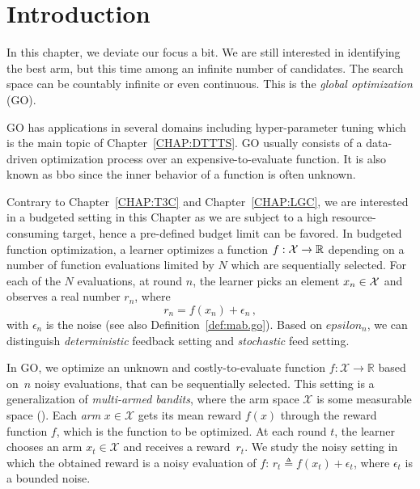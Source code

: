 \section{Introduction}\label{sec:gpo.intro}

In this chapter, we deviate our focus a bit. We are still interested in identifying the best arm, but this time among an infinite number of candidates. The search space can be countably infinite or even continuous. This is the \emph{global optimization} (GO). 

GO has applications in several domains including hyper-parameter tuning \citep{jamieson2016hyperband, li2017hyperband,samothrakis2013} which is the main topic of Chapter~\ref{CHAP:DTTTS}. GO usually consists of a data-driven optimization process over an expensive-to-evaluate function. It is also known as \gls{bbo} since the inner behavior of a function is often unknown.

Contrary to Chapter~\ref{CHAP:T3C} and Chapter~\ref{CHAP:LGC}, we are interested in a budgeted setting in this Chapter as we are subject to a high resource-consuming target, hence a pre-defined budget limit can be favored. In budgeted function optimization, a learner optimizes a function $f: \mathcal{X} \rightarrow \mathbb{R}$ depending on a number of function evaluations limited by $N$ which are sequentially selected. For each of the $N$ evaluations, at round $n$, the learner
picks an element $x_n\in\mathcal{X}$ and observes a real number $r_n$, where 
\[
    r_n = f(x_n) + \epsilon_n\,,
\]
with $\epsilon_n$ is the noise (see also Definition~\ref{def:mab.go}). Based on $epsilon_n$, we can distinguish \emph{deterministic} feedback setting and \emph{stochastic} feed setting. 

In GO, we optimize an unknown and costly-to-evaluate function $f: \mathcal{X} \rightarrow \mathbb{R}$ based on~$n$ noisy evaluations, that can be sequentially selected. This setting is a generalization of \textit{multi-armed bandits}, where the arm space $\mathcal{X}$ is some measurable space (\citealt{bubeck2011pure}). Each \emph{arm} $x \in \mathcal{X}$ gets its mean reward $f(x)$ through the reward function $f$, which is  the function to be optimized. At each round $t$, the learner chooses an arm $x_t \in \mathcal{X}$ and receives a reward~$r_t$. We study the noisy setting in which the obtained reward is a noisy evaluation of $f$: $r_t \triangleq f(x_t) + \epsilon_t$, where $\epsilon_t$ is a bounded noise.


